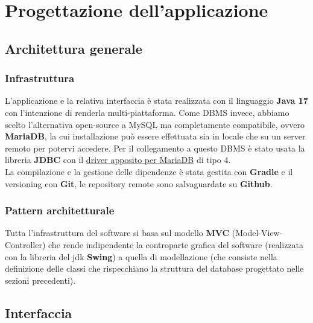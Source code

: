 \documentclass[a4paper,12pt]{report}
\begin{document}
\chapter{Progettazione dell'applicazione}
\section{Architettura generale}
\subsection{Infrastruttura}
L'applicazione e la relativa interfaccia è stata realizzata con il linguaggio \textbf{Java 17} con l'intenzione di renderla multi-piattaforma. Come DBMS invece, abbiamo scelto l'alternativa open-source a MySQL ma completamente compatibile, ovvero \textbf{MariaDB}, la cui installazione può essere effettuata sia in locale che su un server remoto per potervi accedere. Per il collegamento a questo DBMS è stato usata la libreria \textbf{JDBC} con il \href{https://mvnrepository.com/artifact/org.mariadb.jdbc/mariadb-java-client}{driver apposito per MariaDB} di tipo 4.\\
La compilazione e la gestione delle dipendenze è stata gestita con \textbf{Gradle} e il versioning con \textbf{Git}, le repository remote sono salvaguardate su \textbf{Github}.
\subsection{Pattern architetturale}
Tutta l'infrastruttura del software si basa sul modello \textbf{MVC} (Model-View-Controller) che rende indipendente la controparte grafica del software (realizzata con la libreria del jdk \textbf{Swing}) a quella di modellazione (che consiste nella definizione delle classi che rispecchiano la struttura del database progettato nelle sezioni precedenti).

\section{Interfaccia}
\end{document}
